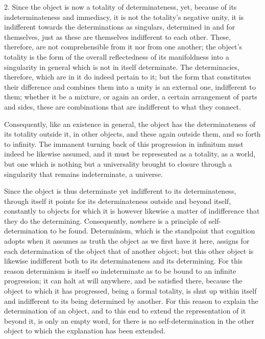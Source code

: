 2. Since the object is now
a totality of determinateness, yet,
because of its indeterminateness and immediacy,
it is not the totality's negative unity,
it is indifferent towards the determinations as singulars,
determined in and for themselves,
just as these are themselves indifferent to each other.
These, therefore, are not comprehensible from it nor from one another;
the object's totality is the form of the overall reflectedness
of its manifoldness into a singularity in general
which is not in itself determinate.
The determinacies, therefore, which are in it do indeed pertain to it;
but the form that constitutes their difference
and combines them into a unity is an external one,
indifferent to them;
whether it be a mixture, or again an order,
a certain arrangement of parts and sides,
these are combinations that are indifferent to what they connect.

Consequently, like an existence in general,
the object has the determinateness of its totality outside it,
in other objects, and these again outside them,
and so forth to infinity.
The immanent turning back of this progression in infinitum
must indeed be likewise assumed,
and it must be represented as a totality, as a world,
but one which is nothing but a universality brought to closure
through a singularity that remains indeterminate,
a universe.

Since the object is thus determinate
yet indifferent to its determinateness,
through itself it points for its determinateness
outside and beyond itself,
constantly to objects for which it is however
likewise a matter of indifference
that they do the determining.
Consequently, nowhere is
a principle of self-determination to be found.
Determinism, which is the standpoint that cognition adopts
when it assumes as truth the object as we first have it here,
assigns for each determination of the object that of another object;
but this other object is likewise indifferent
both to its determinateness and its determining.
For this reason determinism is itself so indeterminate
as to be bound to an infinite progression;
it can halt at will anywhere, and be satisfied there,
because the object to which it has progressed,
being a formal totality, is shut up within itself
and indifferent to its being determined by another.
For this reason to explain the determination of an object,
and to this end to extend the representation of it beyond it,
is only an empty word,
for there is no self-determination
in the other object to which
the explanation has been extended.

